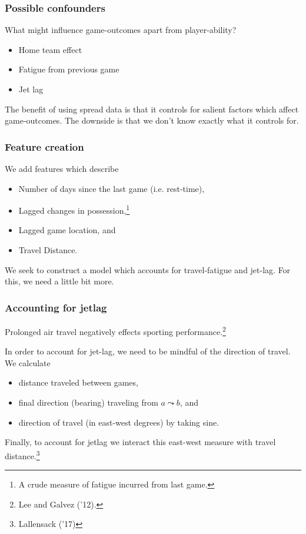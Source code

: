 \documentclass{beamer}
\begin{document}
\begin{frame}
  \frametitle{Possible confounders}
  What might influence game-outcomes apart from player-ability?

  \vspace{12pt}\begin{itemize}     
    \item Home team effect
    \item Fatigue from previous game
    \item Jet lag   
    \end{itemize}

  \vspace{12pt}The benefit of using spread data is that it controls for salient factors which affect game-outcomes.
  The downside is that we don't know exactly what it controls for. \end{frame}

\begin{frame}   \frametitle{Feature creation}
  We add features which describe
  \vspace{12pt}  
  \begin{itemize}     
    \item Number of days since the last game (i.e. rest-time),
    \item Lagged changes in possession,\footnote{A crude measure of fatigue incurred from last game.}
    \item Lagged game location, and
    \item Travel Distance.   
  \end{itemize}
  \vspace{12pt}We seek to construct a model which accounts for travel-fatigue and jet-lag.
  For this, we need a little bit more. \end{frame}

\begin{frame}   \frametitle{Accounting for jetlag}
  Prolonged air travel negatively effects sporting performance.\footnote{Lee and Galvez ('12).}

  \vspace{12pt}In order to account for jet-lag, we need to be mindful of the direction of travel. We calculate
  \vspace{12pt}\begin{itemize}     \item distance traveled between games,
    \item final direction (bearing) traveling from $a \leadsto b$, and
    \item direction of travel (in east-west degrees) by taking sine.
  \end{itemize}
  \vspace{12pt}Finally, to account for jetlag we interact this east-west measure with travel distance.\footnote{Lallensack ('17)} \end{frame}
\end{document}
